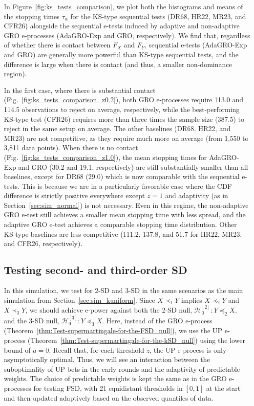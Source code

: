 \documentclass[12pt,twoside]{article}
\theoremstyle{plain}
\theoremstyle{definition}
\theoremstyle{remark}
\newcommand{\calH}{\mathcal{H}}
\newcommand{\ssd}{\preceq_{2}}
\newcommand{\tsd}{\preceq_{3}}
\newcommand{\fsdstrict}{\prec_{1}}
\newcommand{\ssdstrict}{\prec_{2}}
\newcommand{\tsdstrict}{\prec_{3}}
\begin{document}
In Figure~\ref{fig:ks_tests_comparison}, we plot both the histograms and means of the stopping times $\tau_\alpha$ for the KS-type sequential tests (DR68, HR22, MR23, and CFR26) alongside the sequential e-tests induced by adaptive and non-adaptive GRO e-processes (AdaGRO-Exp and GRO, respectively).
We find that, regardless of whether there is contact between $F_X$ and $F_Y$, sequential e-tests (AdaGRO-Exp and GRO) are generally more powerful than KS-type sequential tests, and the difference is large when there is contact (and thus, a smaller non-dominance region). 

In the first case, where there is substantial contact (Fig.~\ref{fig:ks_tests_comparison_z0.2}), both GRO e-processes require 113.0 and 114.5 observations to reject on average, respectively, while the best-performing KS-type test (CFR26) requires more than three times the sample size (387.5) to reject in the same setup on average. 
The other baselines (DR68, HR22, and MR23) are not competitive, as they require much more on average (from 1,550 to 3,811 data points). 
When there is no contact (Fig.~\ref{fig:ks_tests_comparison_z1.0}), the mean stopping times for AdaGRO-Exp and GRO (30.2 and 19.1, respectively) are still substantially smaller than all baselines, except for DR68 (29.0) which is now comparable with the sequential e-tests. 
This is because we are in a particularly favorable case where the CDF difference is strictly positive everywhere except $z=1$ and adaptivity (as in Section~\ref{sec:sim_normal}) is not necessary. 
Even in this regime, the non-adaptive GRO e-test still achieves a smaller mean stopping time with less spread, and the adaptive GRO e-test achieves a comparable stopping time distribution. 
Other KS-type baselines are less competitive (111.2, 137.8, and 51.7 for HR22, MR23, and CFR26, respectively).  
 



\subsection{Testing second- and third-order SD}\label{app:sim_kuniform_ksd}

In this simulation, we test for 2-SD and 3-SD in the same scenarios as the main simulation from Section~\ref{sec:sim_kuniform}. 
Since $X \fsdstrict Y$ implies $X \ssdstrict Y$ and $X \tsdstrict Y$, we should achieve e-power against both the 2-SD null, $\calH_0^{[2]}: Y \ssd X$, and the 3-SD null, $\calH_0^{[3]}: Y \tsd X$. 
Here, instead of the GRO e-process (Theorem~\ref{thm:Test-supermartingale-for-the-FSD_null}), we use the UP e-process (Theorem~\ref{thm:Test-supermartingale-for-the-kSD_null}) using the lower bound of $a=0$. 
Recall that, for each threshold $z$, the UP e-process is only asymptotically optimal. 
Thus, we will see an interaction between the suboptimality of UP bets in the early rounds and the adaptivity of predictable weights. 
The choice of predictable weights is kept the same as in the GRO e-processes for testing FSD, with 21 equidistant thresholds in $[0,1]$ at the start and then updated adaptively based on the observed quantiles of data. 
\end{document}
